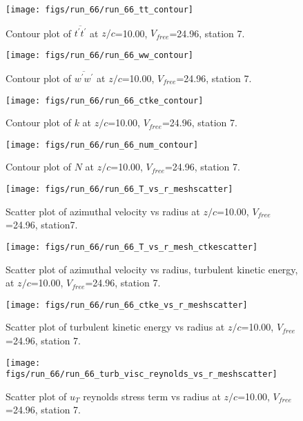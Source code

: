 \begin{figure}[H]
\centering
\texttt{[image: figs/run\_66/run\_66\_tt\_contour]}
\caption{Contour plot of $\overline{t^\prime t^\prime}$ at $z/c$=10.00, $V_{free}$=24.96, station 7.}
\end{figure}


\begin{figure}[H]
\centering
\texttt{[image: figs/run\_66/run\_66\_ww\_contour]}
\caption{Contour plot of $\overline{w^\prime w^\prime}$ at $z/c$=10.00, $V_{free}$=24.96, station 7.}
\end{figure}


\begin{figure}[H]
\centering
\texttt{[image: figs/run\_66/run\_66\_ctke\_contour]}
\caption{Contour plot of $k$ at $z/c$=10.00, $V_{free}$=24.96, station 7.}
\end{figure}


\begin{figure}[H]
\centering
\texttt{[image: figs/run\_66/run\_66\_num\_contour]}
\caption{Contour plot of $N$ at $z/c$=10.00, $V_{free}$=24.96, station 7.}
\end{figure}


\begin{figure}[H]
\centering
\texttt{[image: figs/run\_66/run\_66\_T\_vs\_r\_meshscatter]}
\caption{Scatter plot of azimuthal velocity vs radius at $z/c$=10.00, $V_{free}$=24.96, station7.}
\end{figure}


\begin{figure}[H]
\centering
\texttt{[image: figs/run\_66/run\_66\_T\_vs\_r\_mesh\_ctkescatter]}
\caption{Scatter plot of azimuthal velocity vs radius, turbulent kinetic energy, at $z/c$=10.00, $V_{free}$=24.96, station 7.}
\end{figure}


\begin{figure}[H]
\centering
\texttt{[image: figs/run\_66/run\_66\_ctke\_vs\_r\_meshscatter]}
\caption{Scatter plot of turbulent kinetic energy vs radius at $z/c$=10.00, $V_{free}$=24.96, station 7.}
\end{figure}


\begin{figure}[H]
\centering
\texttt{[image: figs/run\_66/run\_66\_turb\_visc\_reynolds\_vs\_r\_meshscatter]}
\caption{Scatter plot of $
u_T$ reynolds stress term vs radius at $z/c$=10.00, $V_{free}$=24.96, station 7.}
\end{figure}


